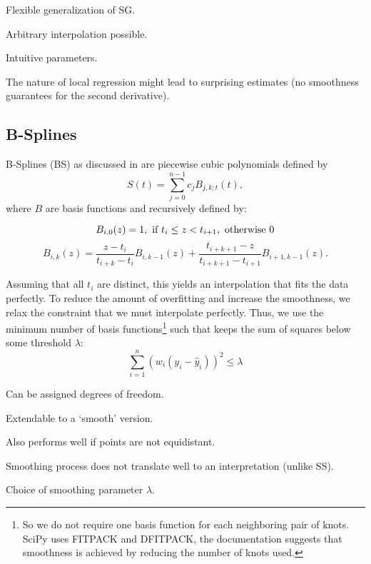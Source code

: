		\begin{my_pros_cons_table}{
				\item Flexible generalization of SG.
				\item Arbitrary interpolation possible.
				\item Intuitive parameters.
			}{
				\item The nature of local regression might lead to surprising estimates (no smoothness guarantees for the second derivative).
			}
		\end{my_pros_cons_table}


	\subsection{B-Splines}
		\label{sec:B}
		B-Splines (BS) as discussed in \cite{lycheSplineMethods2005} are piecewise cubic polynomials defined by 
		$$
			S(t)=\sum_{j=0}^{n-1} c_{j} B_{j, k ; t}(t),
		$$
		where $B$ are basis functions and recursively defined by:
		
		\begin{equation}
				B_{i, 0}(z)=1, \text { if } t_{i} \leq z<t_{i+1}, \text { otherwise } 0 \\
		\end{equation}
		\begin{equation}
			B_{i, k}(z)=\frac{z-t_{i}}{t_{i+k}-t_{i}} B_{i, k-1}(z)+\frac{t_{i+k+1}-z}{t_{i+k+1}-t_{i+1}} B_{i+1, k-1}(z).
		\end{equation}
		
		Assuming that all $t_i$ are distinct, this yields an interpolation that fits the data perfectly. To reduce the amount of overfitting and increase the smoothness, we relax the constraint that we must interpolate perfectly. Thus, we use the minimum number of basis functions\footnote{So we do not require one basis function for each neighboring pair of knots. SciPy uses FITPACK and DFITPACK, the documentation suggests that smoothness is achieved by reducing the number of knots used.} such that keeps the sum of squares below some threshold $\lambda$:
		$$\sum_{i=1}^n(w_i (y_i - \hat y_i))^2 \leq \lambda$$

		\begin{my_pros_cons_table}{
				\item Can be assigned degrees of freedom.
				\item Extendable to a `smooth' version.
				\item Also performs well if points are not equidistant.
			}{
				\item Smoothing process does not translate well to an interpretation (unlike SS).
				\item Choice of smoothing parameter $\lambda$.
			}
		\end{my_pros_cons_table}


